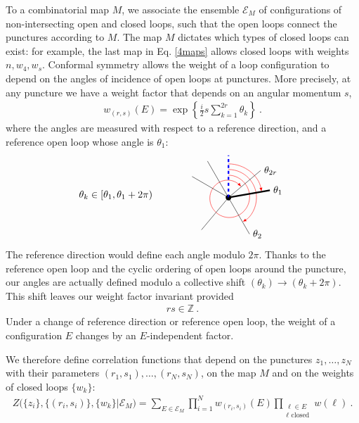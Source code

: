 \documentclass[12pt, a4paper]{article}
\begin{document}
To a combinatorial map $M$, we associate the ensemble $\mathcal{E}_M$ of configurations of non-intersecting open and closed loops, such that the open loops connect the punctures according to $M$. The map $M$ dictates which types of closed loops can exist: for example, the last map in Eq. \eqref{4maps} allows closed loops with weights $n,w_4,w_s$. Conformal symmetry allows the weight of a loop configuration to depend on the angles of incidence of open loops at punctures. 
More precisely, at any puncture we have a weight factor that depends on an angular momentum $s$,
\begin{align}
 \boxed{w_{(r,s)}(E) = \exp \left\{\tfrac{i}{2} s\textstyle{\sum}_{k=1}^{2r}\theta_{k}\right\}}\ .
 \label{wrs}
\end{align}
where the angles are measured with respect to a reference direction, and a reference open loop whose angle is $\theta_1$:
\begin{align}
 \theta_{k}\in [\theta_{1}, \theta_{1}+2\pi)
\qquad \qquad 
 \begin{tikzpicture}[baseline=(base), scale = .5]
  \coordinate (base) at (0, 0);
  \draw [domain=0:410,variable=\t,smooth,samples=35,red,-latex]
        plot ({90-\t}: {1.6- \t/1000});
  \draw[-latex, red] (0, 2.4) arc (90:10:2.4);
  \draw[-latex, red] (0, 2) arc (90:-60:2);
  \draw (0, 0) node[fill, circle, minimum size = 2mm, inner sep = 0]{};
  \foreach\t in {10, 40, 120, 150, 230, 300}{
  \draw (0, 0) -- ++(\t:3);
  }
  \draw[ultra thick, blue, dashed] (0, 0) -- ++(90:3);
  \draw[ultra thick] (0, 0) -- ++(10:3);
  \node[right] at ++(10:3) {$\theta_{1}$};
  \node[right] at ++(300:3) {$\theta_{2}$};
  \node[right] at ++(40:3) {$\theta_{2r}$};
 \end{tikzpicture}
 \label{titt}
\end{align}
The reference direction would define each angle modulo $2\pi$. Thanks to the reference open loop and the cyclic ordering of open loops around the puncture, our angles are actually defined modulo a collective shift $(\theta_k) \to (\theta_k+2\pi)$. This shift leaves our weight factor invariant provided 
\begin{align}
 rs\in \mathbb{Z}\ . 
\end{align}
Under a change of reference direction or reference open loop, the weight of a configuration $E$ changes by an $E$-independent factor.

We therefore define correlation functions that depend on the punctures $z_1,\dots,z_N$ with their parameters $(r_1,s_1),\dots, (r_N,s_N)$, on the map $M$ and on the weights of closed loops $\{w_k\}$:
\begin{align}
 \boxed{Z\Big(\{z_i\},\{(r_i,s_i)\},\{w_k\}\Big|\mathcal{E}_M\Big) =\sum_{E\in\mathcal{E}_M} \prod_{i=1}^N w_{(r_i,s_i)}(E) \prod_{\substack{\ell\in E\\ \ell \text{ closed}}} w(\ell)} \ .
 \label{zbig}
\end{align}
\end{document}
